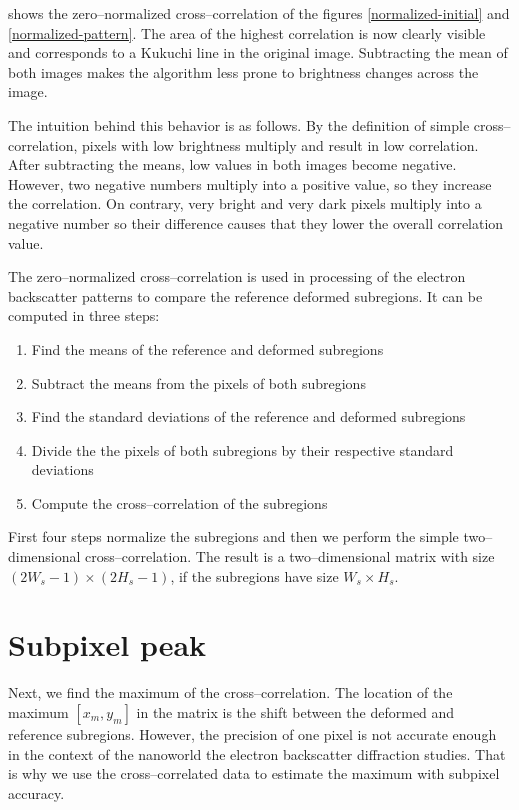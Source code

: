  shows the zero--normalized cross--correlation of the figures \ref{normalized-initial} and \ref{normalized-pattern}. The area of the highest correlation is now clearly visible and corresponds to a Kukuchi line in the original image. Subtracting the mean of both images makes the algorithm less prone to brightness changes across the image.

The intuition behind this behavior is as follows. By the definition of simple cross--correlation, pixels with low brightness multiply and result in low correlation. After subtracting the means, low values in both images become negative. However, two negative numbers multiply into a positive value, so they increase the correlation. On contrary, very bright and very dark pixels multiply into a negative number so their difference causes that they lower the overall correlation value.

The zero--normalized cross--correlation is used in processing of the electron backscatter patterns to compare the reference deformed subregions. It can be computed in three steps:
\begin{enumerate}
	\item Find the means of the reference and deformed subregions
	\item Subtract the means from the pixels of both subregions
	\item Find the standard deviations of the reference and deformed subregions
	\item Divide the the pixels of both subregions by their respective standard deviations
	\item Compute the cross--correlation of the subregions
\end{enumerate}
First four steps normalize the subregions and then we perform the simple two--dimensional cross--correlation. The result is a two--dimensional matrix with size $(2W_s-1) \times (2H_s-1)$, if the subregions have size $W_s \times H_s$.


\section{Subpixel peak}
\label{subpixel-peak}
Next, we find the maximum of the cross--correlation. The location of the maximum $[x_m,y_m]$ in the matrix is the shift between the deformed and reference subregions. However, the precision of one pixel is not accurate enough in the context of the nanoworld the electron backscatter diffraction studies. That is why we use the cross--correlated data to estimate the maximum with subpixel accuracy.

